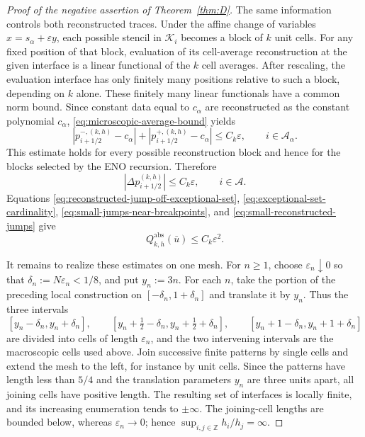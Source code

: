 \documentclass[11pt]{amsart}
\theoremstyle{plain}
\theoremstyle{definition}
\theoremstyle{remark}
\numberwithin{equation}{section}
\theoremstyle{plain}
\begin{document}
\begin{proof}[Proof of the negative assertion of
	Theorem~\ref{thm:D}]
	The same information controls both reconstructed traces.  Under the affine
	change of variables $x=s_\alpha+\varepsilon y$, each possible stencil in
	$\mathcal K_i$ becomes a block of $k$ unit cells.  For any fixed position of
	that block, evaluation of its cell-average reconstruction at the given
	interface is a linear functional of the $k$ cell averages.  After rescaling,
	the evaluation interface has only finitely many positions relative to such a
	block, depending on $k$ alone.  These finitely many linear functionals have a
	common norm bound.  Since constant data equal to $c_\alpha$ are
	reconstructed as the constant polynomial $c_\alpha$,
	\eqref{eq:microscopic-average-bound} yields
	\begin{equation}\label{eq:microscopic-trace-bound}
		|p_{i+1/2}^{-,(k,h)}-c_\alpha|
		+
		|p_{i+1/2}^{+,(k,h)}-c_\alpha|
		\le C_k\varepsilon,
		\qquad i\in\mathcal A_\alpha.
	\end{equation}
	This estimate holds for every possible reconstruction block and hence for
	the blocks selected by the ENO recursion.  Therefore
	\begin{equation}\label{eq:small-reconstructed-jumps}
		|\Delta p_{i+1/2}^{(k,h)}|
		\le C_k\varepsilon,
		\qquad i\in\mathcal A.
	\end{equation}
	Equations \eqref{eq:reconstructed-jump-off-exceptional-set},
	\eqref{eq:exceptional-set-cardinality},
	\eqref{eq:small-jumps-near-breakpoints}, and
	\eqref{eq:small-reconstructed-jumps} give
	\begin{equation}\label{eq:absolute-source-upper-bound}
		Q_{k,h}^{\mathrm{abs}}(\bar u)
		\le C_k\varepsilon^2.
	\end{equation}
	
	It remains to realize these estimates on one mesh.  For $n\ge1$, choose
	$\varepsilon_n\downarrow0$ so that
	$\delta_n:=N\varepsilon_n<1/8$, and put $y_n:=3n$.
	For each $n$, take the portion of the preceding local construction on
	$[-\delta_n,1+\delta_n]$ and translate it by $y_n$.  Thus the three
	intervals
	\[
	[y_n-\delta_n,y_n+\delta_n],\qquad
	[y_n+\tfrac12-\delta_n,y_n+\tfrac12+\delta_n],\qquad
	[y_n+1-\delta_n,y_n+1+\delta_n]
	\]
	are divided into cells of length $\varepsilon_n$, and the two intervening
	intervals are the macroscopic cells used above.  Join successive finite
	patterns by single cells and extend the mesh to the left, for instance by
	unit cells.  Since the patterns have length less than $5/4$ and the
	translation parameters $y_n$ are three units apart, all joining cells have
	positive length.
	The resulting set of interfaces is locally finite, and its increasing
	enumeration tends to $\pm\infty$.
	The joining-cell lengths are bounded below, whereas
	$\varepsilon_n\to0$; hence
	$\sup_{i,j\in\mathbb Z}h_i/h_j=\infty$.
	

\end{proof}
\end{document}
